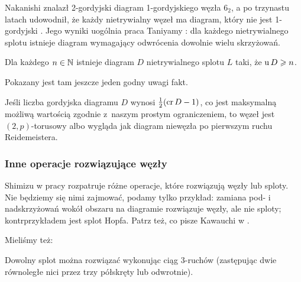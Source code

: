 Nakanishi \cite{nakanishi1983} znalazł 2-gordyjski diagram 1-gordyjskiego węzła $6_2$, a po trzynastu latach udowodnił, że każdy nietrywialny węzeł ma diagram, który nie jest 1-gordyjski \cite{nakanishi1996}.
%
Jego wyniki uogólnia praca Taniyamy \cite{taniyama2009}: dla każdego nietrywialnego splotu istnieje diagram wymagający odwrócenia dowolnie wielu skrzyżowań.
%

\begin{proposition}
    Dla każdego $n \in \mathbb N$ istnieje diagram $D$ nietrywialnego splotu $L$ taki, że $\operatorname{u} D \geqslant n$.
\end{proposition}

Pokazany jest tam jeszcze jeden godny uwagi fakt.

\begin{proposition}
    Jeśli liczba gordyjska diagramu $D$ wynosi $\frac 12 (\operatorname{cr} D - 1)$, co jest maksymalną możliwą wartością zgodnie z~naszym prostym ograniczeniem, to węzeł jest $(2,p)$-torusowy albo wygląda jak diagram niewęzła po pierwszym ruchu Reidemeistera.
\end{proposition}











\subsubsection{Inne operacje rozwiązujące węzły}

Shimizu w pracy \cite{shimizu2014} rozpatruje różne operacje, które rozwiązują węzły lub sploty.
%
Nie będziemy się nimi zajmować, podamy tylko przykład: zamiana pod- i nadskrzyżowań wokół obszaru na diagramie rozwiązuje węzły, ale nie sploty; kontrprzykładem jest splot Hopfa.
%
Patrz też, co pisze Kawauchi w \cite[s. 141-154]{kawauchi1996}.

Mieliśmy też:

\begin{conjecture}
    Dowolny splot można rozwiązać wykonując ciąg 3-ruchów (zastępując dwie równoległe nici przez trzy półskręty lub odwrotnie).
\end{conjecture}


